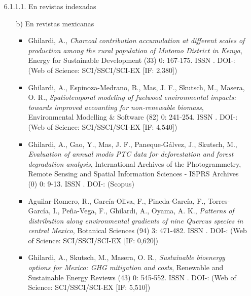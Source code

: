 \documentclass[12pt]{report}
\begin{document}
\begin{enumerate}
\begin{enumerate}
{\begin{enumerate}
\begin{enumerate}
                                                        \item[6.1.1.1.] En revistas indexadas
                                                                \begin{itemize}


                                                                            \item[b)] En revistas mexicanas
                                                                                \begin{itemize}

                                                                                        \item{  Ghilardi, A.,\textit{ Charcoal contribution accumulation at different scales of production among the rural population of Mutomo District in Kenya}, Energy for Sustainable Development (33) 0: 167-175. ISSN . DOI-:  (Web of Science: SCI/SSCI/SCI-EX [IF: 2,380])}

                                                                                        \item{  Ghilardi, A., Espinoza-Medrano, B., Mas, J. F., Skutsch, M., Masera, O. R.,\textit{ Spatiotemporal modeling of fuelwood environmental impacts: towards improved accounting for non-renewable biomass}, Environmental Modelling & Software (82) 0: 241-254. ISSN . DOI-:  (Web of Science: SCI/SSCI/SCI-EX [IF: 4,540])}

                                                                                        \item{  Ghilardi, A., Gao, Y., Mas, J. F., Paneque-Gálvez, J., Skutsch, M.,\textit{ Evaluation of annual modis PTC data for deforestation and forest degradation analysis}, International Archives of the Photogrammetry, Remote Sensing and Spatial Information Sciences - ISPRS Archives (0) 0: 9-13. ISSN . DOI-:  (Scopus)}

                                                                                        \item{  Aguilar-Romero, R., García-Oliva, F., Pineda-García, F., Torres-García, I., Peña-Vega, F., Ghilardi, A., Oyama, A. K.,\textit{ Patterns of distribution along environmental gradients of nine Quercus species in central Mexico}, Botanical Sciences (94) 3: 471-482. ISSN . DOI-:  (Web of Science: SCI/SSCI/SCI-EX [IF: 0,620])}

                                                                                        \item{  Ghilardi, A., Skutsch, M., Masera, O. R.,\textit{ Sustainable bioenergy options for Mexico: GHG mitigation and costs}, Renewable and Sustainable Energy Reviews (43) 0: 545-552. ISSN . DOI-:  (Web of Science: SCI/SSCI/SCI-EX [IF: 5,510])}


\end{itemize}
\end{itemize}
\end{enumerate}
\end{enumerate}}
\end{enumerate}
\end{enumerate}
\end{document}
